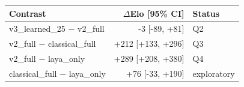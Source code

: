 \scriptsize\setlength{\tabcolsep}{2.2pt}\begin{tabular}{lrl}\toprule
Contrast & $\Delta$Elo [95\% CI] & Status \\
\midrule
v3\_learned\_25 $-$ v2\_full & -3 [-89, +81] & Q2 \\
v2\_full $-$ classical\_full & +212 [+133, +296] & Q3 \\
v2\_full $-$ laya\_only & +289 [+208, +380] & Q4 \\
classical\_full $-$ laya\_only & +76 [-33, +190] & exploratory \\
\bottomrule\end{tabular}
